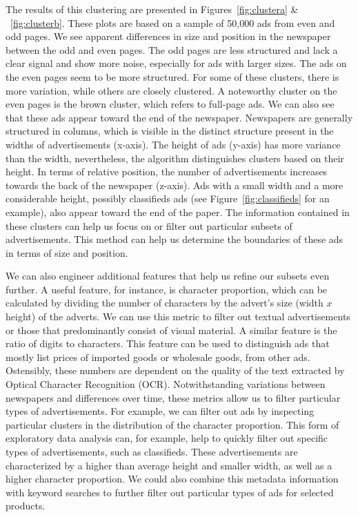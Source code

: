 \documentclass[USenglish]{article}
\begin{document}
The results of this clustering are presented in Figures~\ref{fig:clustera} \& ~\ref{fig:clusterb}. These plots are based on a sample of 50,000 ads from even and odd pages. We see apparent differences in size and position in the newspaper between the odd and even pages. The odd pages are less structured and lack a clear signal and show more noise, especially for ads with larger sizes. The ads on the even pages seem to be more structured. For some of these clusters, there is more variation, while others are closely clustered. A noteworthy cluster on the even pages is the brown cluster, which refers to full-page ads. 
%
We can also see that these ads appear toward the end of the newspaper. Newspapers are generally structured in columns, which is visible in the distinct structure present in the widths of advertisements (x-axis). The height of ads (y-axis) has more variance than the width, nevertheless, the algorithm distinguishes clusters based on their height. In terms of relative position, the number of advertisements increases towards the back of the newspaper (z-axis). Ads with a small width and a more considerable height, possibly classifieds ads (see Figure~\ref{fig:classifieds} for an example), also appear toward the end of the paper. 
%
The information contained in these clusters can help us focus on or filter out particular subsets of advertisements. This method can help us determine the boundaries of these ads in terms of size and position. 

We can also engineer additional features that help us refine our subsets even further. A useful feature, for instance, is character proportion, which can be calculated by dividing the number of characters by the advert's size (width $x$ height) of the adverts. We can use this metric to filter out textual advertisements or those that predominantly consist of visual material. A similar feature is the ratio of digits to characters. This feature can be used to distinguish ads that mostly list prices of imported goods or wholesale goods, from other ads. 
%
Ostensibly, these numbers are dependent on the quality of the text extracted by Optical Character Recognition (OCR). Notwithstanding variations between newspapers and differences over time, these metrics allow us to filter particular types of advertisements. For example, we can filter out ads by inspecting particular clusters in the distribution of the character proportion. This form of exploratory data analysis can, for example, help to quickly filter out specific types of advertisements, such as classifieds. These advertisements are characterized by a higher than average height and smaller width, as well as a higher character proportion. We could also combine this metadata information with keyword searches to further filter out particular types of ads for selected products. 
\end{document}
